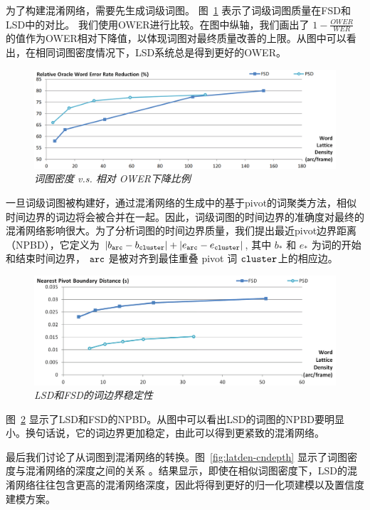 为了构建混淆网络，需要先生成词级词图。 图~\ref{fig:OWER-latden} 表示了词级词图质量在FSD和LSD中的对比。
我们使用OWER进行比较。在图中纵轴，我们画出了 $1-\frac{OWER}{WER}$ 的值作为OWER相对下降值，以体现词图对最终质量改善的上限。从图中可以看出，在相同词图密度情况下，LSD系统总是得到更好的OWER。
      \begin{figure}[tbhp!]
        \centering
        \includegraphics[width=\linewidth]{figure/OWER-latden.png}
        \caption{{\it 词图密度 v.s. 相对 OWER下降比例}}
        \label{fig:OWER-latden}
      \end{figure}
一旦词级词图被构建好，通过混淆网络的生成中的基于pivot的词聚类方法，相似时间边界的词边将会被合并在一起。因此，词级词图的时间边界的准确度对最终的混淆网络影响很大。为了分析词图的时间边界质量，我们提出最近pivot边界距离（NPBD），它定义为 $|b_{\tt arc}-b_{\tt cluster}|+|e_{\tt arc}-e_{\tt cluster}|$, 其中 $b_*$ 和 $e_*$ 为词的开始和结束时间边界， $\tt arc$ 是被对齐到最佳重叠 pivot 词 $\tt cluster$上的相应边。

      \begin{figure}[tbhp!]
        \centering
        \includegraphics[width=\linewidth]{figure/bound-stable.png}
        \caption{{\it LSD和FSD的词边界稳定性}}
        \label{fig:bound-stable}
      \end{figure}
图~\ref{fig:bound-stable} 显示了LSD和FSD的NPBD。从图中可以看出LSD的词图的NPBD要明显小。换句话说，它的词边界更加稳定，由此可以得到更紧致的混淆网络。

最后我们讨论了从词图到混淆网络的转换。图~\ref{fig:latden-cndepth} 显示了词图密度与混淆网络的深度之间的关系 \cite{hakkani2006beyond}。结果显示，即使在相似词图密度下，LSD的混淆网络往往包含更高的混淆网络深度，因此将得到更好的归一化项建模以及置信度建模方案。 

